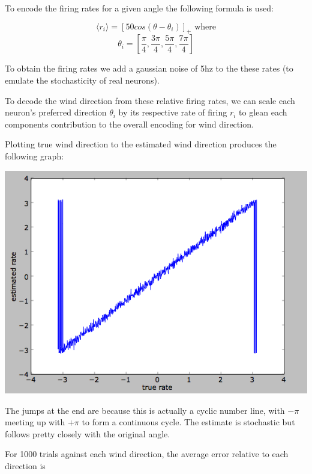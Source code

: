 \documentclass[12pt]{article}
\begin{document}
To encode the firing rates for a given angle the following formula is used:

$$ \langle r_i \rangle=[50cos(\theta-\theta_i)]_+ \text{ where}$$
$$ \theta_i=[\frac{\pi}{4},\frac{3\pi}{4},\frac{5\pi}{4},\frac{7\pi}{4}] $$

To obtain the firing rates we add a gaussian noise of 5hz to the these rates (to emulate the stochasticity of real neurons).  

To decode the wind direction from these relative firing rates, we can scale each neuron's preferred direction $\theta_i$ by its respective rate of firing $r_i$ to glean each components contribution to the overall encoding for wind direction.  

Plotting true wind direction to the estimated wind direction produces the following graph:

\vspace{15pt}
\includegraphics[scale=0.5]{truevsestimated.png}
\vspace{5pt}

The jumps at the end are because this is actually a cyclic number line, with $-\pi$ meeting up with $+\pi$ to form a continuous cycle.  The estimate is stochastic but follows pretty closely with the original angle.

For 1000 trials against each wind direction, the average error relative to each direction is
\end{document}
